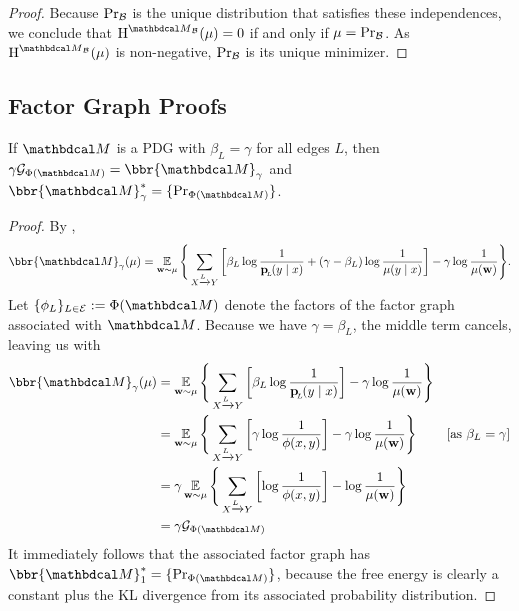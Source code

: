 \begin{proof}
	Because $\Pr_{\cal B}$ is the unique distribution that satisfies these independences, we conclude that $\H^{\PDGof{\cal B}}(\mu) = 0$ if and only if $\mu = \Pr_{\cal B}$. 	
	As $\H^{\PDGof{\cal B}}(\mu)$ is non-negative, $\Pr_{\cal B}$ is its unique minimizer. 
\end{proof}

\subsection{Factor Graph Proofs}
{}
If $\dg M$ is a PDG with $\beta_L = \gamma$ for all edges $L$, then
$\gamma \mathcal G_{\Phi(\dg M)} = \bbr{\dg M}_{\gamma}$ and
$\bbr{\dg M}_{\gamma}^* = \{\Pr_{\Phi({\dg M})} \}$.
\eothm
	
\begin{proof}
	By ,
	\[ \bbr{\dg M}_\gamma(\mu)= \E_{\mat w \sim \mu} \Bigg\{   \sum_{ X \xrightarrow{\!\!L} Y  } \left[
		\beta_L \log \frac{1}{\bp(y\mid x)} + (\gamma
					- \beta_L ) \log \frac{1}{\mu(y \mid x)}
					\right] - \gamma \log \frac{1}{\mu(\mat w)}
			\Bigg\}.  \]
	Let $\{\phi_L\}_{L \in \Ed} := \Phi(\dg M)$ denote the
			factors of the factor graph associated with $\dg M$. 
	Because we have $\gamma  = \beta_L$, the middle term cancels, leaving us with
	\begin{align*}
	\bbr{\dg M}_\gamma(\mu) &= \E_{\mat w \sim \mu} \Bigg\{   \sum_{ X \xrightarrow{\!\!L} Y  } \left[
		\beta_L \log \frac{1}{\bp(y\mid x)} \right] - \gamma \log \frac{1}{\mu(\mat w)} \Bigg\} \\
		&= \E_{\mat w \sim \mu} \Bigg\{   \sum_{ X \xrightarrow{\!\!L} Y  } \left[
			\gamma \log \frac{1}{\phi(x,y)}  \right] - \gamma \log \frac{1}{\mu(\mat w)} \Bigg\} 
					&\text{[as $\beta_L = \gamma$]}\\
		&= \gamma \E_{\mat w \sim \mu} \Bigg\{   \sum_{ X \xrightarrow{\!\!L} Y  } \left[
			\log \frac{1}{\phi(x,y)}  \right] -\log \frac{1}{\mu(\mat w)} \Bigg\} \\
		&= \gamma \mathcal G_{\Phi(\dg M)}
	\end{align*}
	It immediately follows that the associated factor graph has $\bbr{\dg M}^*_1 = \{\Pr_{\Phi(\dg M)}\}$, because the free energy is clearly a constant plus the KL divergence from its associated probability distribution.
\end{proof}

